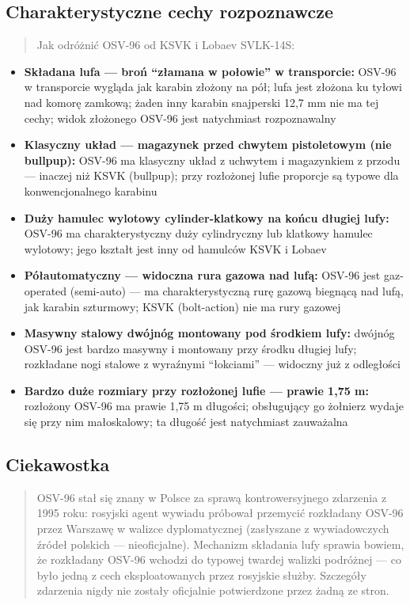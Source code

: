 \documentclass[12pt,oneside]{book}
\providecommand{\tightlist}{%
  \setlength{\itemsep}{0pt}\setlength{\parskip}{0pt}}
\begin{document}
\subsection{Charakterystyczne cechy
rozpoznawcze}\label{charakterystyczne-cechy-rozpoznawcze-81}

\begin{quote}
Jak odróżnić OSV-96 od KSVK i Lobaev SVLK-14S:
\end{quote}

\begin{itemize}
\tightlist
\item
  \textbf{Składana lufa --- broń ``złamana w połowie'' w transporcie:}
  OSV-96 w transporcie wygląda jak karabin złożony na pół; lufa jest
  złożona ku tyłowi nad komorę zamkową; żaden inny karabin snajperski
  12,7 mm nie ma tej cechy; widok złożonego OSV-96 jest natychmiast
  rozpoznawalny
\item
  \textbf{Klasyczny układ --- magazynek przed chwytem pistoletowym (nie
  bullpup):} OSV-96 ma klasyczny układ z uchwytem i magazynkiem z przodu
  --- inaczej niż KSVK (bullpup); przy rozłożonej lufie proporcje są
  typowe dla konwencjonalnego karabinu
\item
  \textbf{Duży hamulec wylotowy cylinder-klatkowy na końcu długiej
  lufy:} OSV-96 ma charakterystyczny duży cylindryczny lub klatkowy
  hamulec wylotowy; jego kształt jest inny od hamulców KSVK i Lobaev
\item
  \textbf{Półautomatyczny --- widoczna rura gazowa nad lufą:} OSV-96
  jest gaz-operated (semi-auto) --- ma charakterystyczną rurę gazową
  biegnącą nad lufą, jak karabin szturmowy; KSVK (bolt-action) nie ma
  rury gazowej
\item
  \textbf{Masywny stalowy dwójnóg montowany pod środkiem lufy:} dwójnóg
  OSV-96 jest bardzo masywny i montowany przy środku długiej lufy;
  rozkładane nogi stalowe z wyraźnymi ``łokciami'' --- widoczny już z
  odległości
\item
  \textbf{Bardzo duże rozmiary przy rozłożonej lufie --- prawie 1,75 m:}
  rozłożony OSV-96 ma prawie 1,75 m długości; obsługujący go żołnierz
  wydaje się przy nim małoskalowy; ta długość jest natychmiast
  zauważalna
\end{itemize}

\subsection{Ciekawostka}\label{ciekawostka-81}

\begin{quote}
OSV-96 stał się znany w Polsce za sprawą kontrowersyjnego zdarzenia z
1995 roku: rosyjski agent wywiadu próbował przemycić rozkładany OSV-96
przez Warszawę w walizce dyplomatycznej (zasłyszane z wywiadowczych
źródeł polskich --- nieoficjalne). Mechanizm składania lufy sprawia
bowiem, że rozkładany OSV-96 wchodzi do typowej twardej walizki
podróżnej --- co było jedną z cech eksploatowanych przez rosyjskie
służby. Szczegóły zdarzenia nigdy nie zostały oficjalnie potwierdzone
przez żadną ze stron.
\end{quote}
\end{document}
